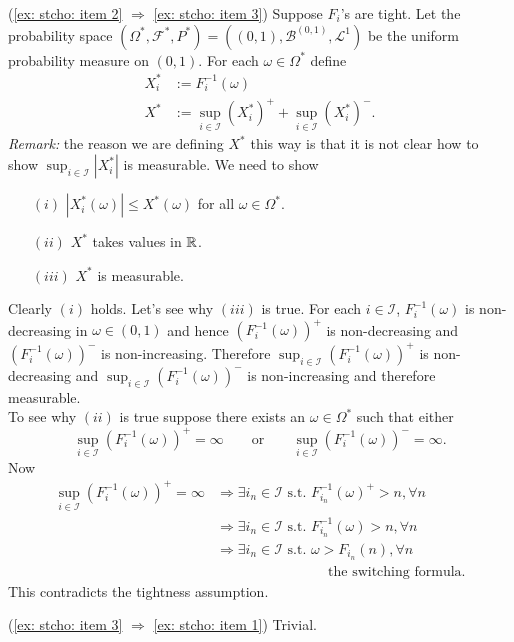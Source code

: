 \begin{exerciseproof}
(\ref{ex: stcho: item 2} $\Longrightarrow$ \ref{ex: stcho: item 3}) Suppose $F_i$'s are tight.  Let the probability space $(\Omega^*, \mathcal F^*, P^*) = ((0,1), \mathcal B^{(0,1)}, \mathcal L^1)$ be the uniform probability measure on $(0,1)$. For each $\omega\in\Omega^*$ define
\begin{align*}
X_i^* &:= F_i^{-1}(\omega)\\
X^*   &:= \sup_{i\in \mathcal I} (X_i^*)^+ + \sup_{i\in \mathcal I} (X_i^*)^-.
\end{align*}
{\em Remark:} the reason we are defining $X^*$ this way is that it is not clear how to show $\sup_{i\in \mathcal I} |X_i^*|$ is measurable. We need to show
\begin{itemize}
\item[$(i)$] $|X^*_i(\omega)|\leq X^*(\omega)$ for all $\omega\in \Omega^*$.
\item[$(ii)$] $X^*$ takes values in $\Bbb R$.
\item[$(iii)$] $X^*$ is measurable.
\end{itemize}
Clearly $(i)$ holds.
Let's see why $(iii)$ is true. For each $i\in\mathcal I$, $F^{-1}_i(\omega)$ is non-decreasing in $\omega \in (0,1)$ and hence $(F^{-1}_i(\omega))^+$ is non-decreasing and   $(F^{-1}_i(\omega))^-$  is non-increasing. Therefore $\sup_{i\in \mathcal I} (F_i^{-1}(\omega))^+$ is non-decreasing and $\sup_{i\in \mathcal I} (F_i^{-1}(\omega))^-$ is non-increasing and therefore measurable.\\
To see why $(ii)$ is true suppose there exists an $\omega\in\Omega^*$ such that either
\[
 \sup_{i\in \mathcal I} (F_i^{-1}(\omega))^+=\infty \qquad\text{or}\qquad \sup_{i\in \mathcal I} (F_i^{-1}(\omega))^- = \infty.
\]
Now
\begin{align*}
\sup_{i\in \mathcal I} (F_i^{-1}(\omega))^+=\infty
&\Longrightarrow \text{$\exists i_n\in\mathcal I$ s.t. $F_{i_n}^{-1}(\omega)^+>n, \forall n$ }\\
&\Longrightarrow \text{$\exists i_n\in\mathcal I$ s.t.  $F_{i_n}^{-1}(\omega)>n, \forall n$} \\
&\Longrightarrow \text{$\exists i_n\in\mathcal I$ s.t.  $\omega>F_{i_n}(n), \forall n$}\\
&\qquad\qquad\qquad\qquad\text{the switching formula.}
\end{align*}
This contradicts the tightness assumption.

(\ref{ex: stcho: item 3} $\Longrightarrow$ \ref{ex: stcho: item 1}) Trivial.



\end{exerciseproof}
